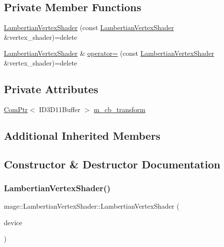 \subsection*{Private Member Functions}
\begin{DoxyCompactItemize}
\item 
\hyperlink{classmage_1_1_lambertian_vertex_shader_add164d66906e307d95232b2c41567a21}{Lambertian\+Vertex\+Shader} (const \hyperlink{classmage_1_1_lambertian_vertex_shader}{Lambertian\+Vertex\+Shader} \&vertex\+\_\+shader)=delete
\item 
\hyperlink{classmage_1_1_lambertian_vertex_shader}{Lambertian\+Vertex\+Shader} \& \hyperlink{classmage_1_1_lambertian_vertex_shader_a974b43346ab5d8081d9101f715e7670d}{operator=} (const \hyperlink{classmage_1_1_lambertian_vertex_shader}{Lambertian\+Vertex\+Shader} \&vertex\+\_\+shader)=delete
\end{DoxyCompactItemize}
\subsection*{Private Attributes}
\begin{DoxyCompactItemize}
\item 
\hyperlink{namespacemage_ae74f374780900893caa5555d1031fd79}{Com\+Ptr}$<$ I\+D3\+D11\+Buffer $>$ \hyperlink{classmage_1_1_lambertian_vertex_shader_aae0f2411821315d89eeb982e6c30c22e}{m\+\_\+cb\+\_\+transform}
\end{DoxyCompactItemize}
\subsection*{Additional Inherited Members}


\subsection{Constructor \& Destructor Documentation}
\hypertarget{classmage_1_1_lambertian_vertex_shader_a96895a373639cf89d2fe4552203aeeda}{}\label{classmage_1_1_lambertian_vertex_shader_a96895a373639cf89d2fe4552203aeeda} 
\subsubsection{\texorpdfstring{Lambertian\+Vertex\+Shader()}{LambertianVertexShader()}\hspace{0.1cm}{\footnotesize\ttfamily [1/2]}}
{\footnotesize\ttfamily mage\+::\+Lambertian\+Vertex\+Shader\+::\+Lambertian\+Vertex\+Shader (\begin{DoxyParamCaption}\item[{const \hyperlink{classmage_1_1_rendering_device}{Rendering\+Device} \&}]{device }\end{DoxyParamCaption})}

